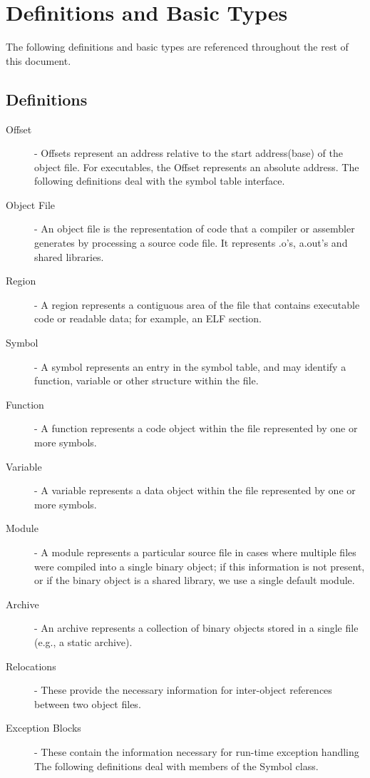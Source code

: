 \section{Definitions and Basic Types}

The following definitions and basic types are referenced throughout the rest of this document.

\subsection{Definitions}

\begin{description}
\item[Offset] - Offsets represent an address relative to the start address(base) of the object file. For executables, the Offset represents an absolute address.
The following definitions deal with the symbol table interface.
\item[Object File] - An object file is the representation of code that a compiler or assembler generates by processing a source code file. It represents .o's, a.out's and shared libraries.
\item[Region] - A region represents a contiguous area of the file that contains executable code or readable data; for example, an ELF section.
\item[Symbol] - A symbol represents an entry in the symbol table, and may identify a function, variable or other structure within the file.
\item[Function] - A function represents a code object within the file represented by one or more symbols.
\item[Variable] - A variable represents a data object within the file represented by one or more symbols.
\item[Module] - A module represents a particular source file in cases where multiple files were compiled into a single binary object; if this information is not present, or if the binary object is a shared library, we use a single default module.
\item[Archive] - An archive represents a collection of binary objects stored in a single file (e.g., a static archive). 
\item[Relocations] - These provide the necessary information for inter-object references between two object files.
\item[Exception Blocks] - These contain the information necessary for run-time exception handling
The following definitions deal with members of the Symbol class.

\end{description}
